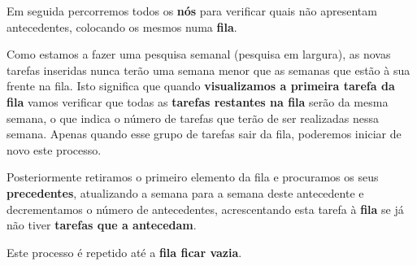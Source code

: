 \documentclass[11pt]{article}
\begin{document}
Em seguida percorremos todos os \textbf{nós} para verificar quais não apresentam antecedentes,
colocando os mesmos numa \textbf{fila}.

Como estamos a fazer uma pesquisa semanal (pesquisa em largura), as novas tarefas inseridas nunca terão
uma semana menor que as semanas que estão à sua frente na fila. Isto significa que quando \textbf{visualizamos a
primeira tarefa da fila} vamos verificar que todas as \textbf{tarefas restantes na fila} serão da mesma semana,
o que indica o número de tarefas que terão de ser realizadas nessa semana. Apenas quando esse grupo de
tarefas sair da fila, poderemos iniciar de novo este processo. 

Posteriormente retiramos o primeiro elemento da fila e procuramos os seus \textbf{precedentes}, atualizando a
semana para a semana deste antecedente e decrementamos o número de antecedentes, acrescentando esta tarefa à
\textbf{fila} se já não tiver \textbf{tarefas que a antecedam}.

Este processo é repetido até a \textbf{fila ficar vazia}.
\end{document}
